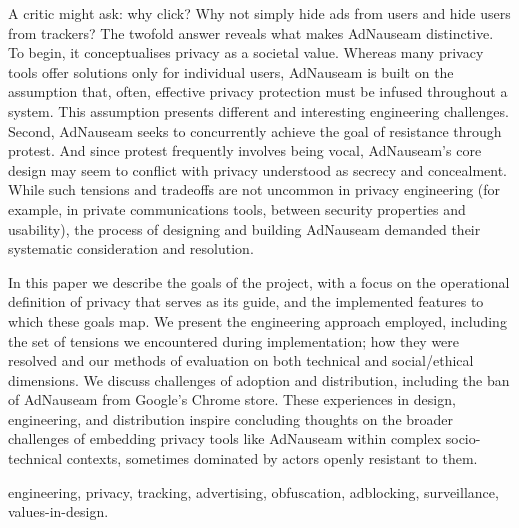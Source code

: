 \documentclass[conference]{IEEEtran}
\begin{document}
A critic might ask: why click? Why not simply hide ads from users and hide users from trackers? The twofold answer reveals what makes AdNauseam distinctive. To begin, it conceptualises privacy as a societal value. Whereas many privacy tools offer solutions only for individual users, AdNauseam is built on the assumption that, often, effective privacy protection must be infused throughout a system. This assumption presents different and interesting engineering challenges. Second, AdNauseam seeks to concurrently achieve the goal of resistance through protest. And since protest frequently involves being vocal, AdNauseam's core design may seem to conflict with privacy understood as secrecy and concealment. While such tensions and tradeoffs are not uncommon in privacy engineering (for example, in private communications tools, between security properties and usability), the process of designing and building AdNauseam demanded their systematic consideration and resolution.

In this paper we describe the goals of the project, with a focus on the operational definition of privacy that serves as its guide, and the implemented features to which these goals map. We present the engineering approach employed, including the set of tensions we encountered during implementation; how they were resolved and our methods of evaluation on both technical and social/ethical dimensions. We discuss challenges of adoption and distribution, including the ban of AdNauseam from Google's Chrome store. These experiences in design, engineering, and distribution inspire concluding thoughts on the broader challenges of embedding privacy tools like AdNauseam within complex socio-technical contexts, sometimes dominated by actors openly resistant to them.

\vspace{5mm}

\begin{IEEEkeywords}
engineering, privacy, tracking, advertising, obfuscation, adblocking, surveillance, values-in-design.
\end{IEEEkeywords}

%
\IEEEpeerreviewmaketitle
\end{document}
